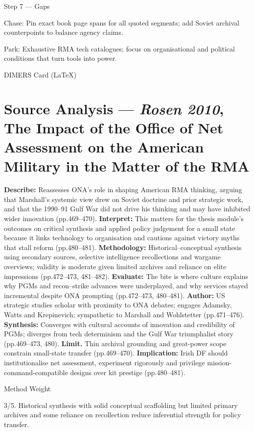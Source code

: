 Step 7 — Gaps

Chase: Pin exact book page spans for all quoted segments; add Soviet archival counterpoints to balance agency claims.

Park: Exhaustive RMA tech catalogues; focus on organisational and political conditions that turn tools into power.

\parencite{ROSEN_2010}

DIMERS Card (LaTeX)

\section*{Source Analysis — \textit{Rosen 2010}, The Impact of the Office of Net Assessment on the American Military in the Matter of the RMA}
\textbf{Describe:} Reassesses ONA’s role in shaping American RMA thinking, arguing that Marshall’s systemic view drew on Soviet doctrine and prior strategic work, and that the 1990–91 Gulf War did not drive his thinking and may have inhibited wider innovation (pp.469–470).
\textbf{Interpret:} This matters for the thesis module’s outcomes on critical synthesis and applied policy judgement for a small state because it links technology to organisation and cautions against victory myths that stall reform (pp.480–481).
\textbf{Methodology:} Historical–conceptual synthesis using secondary sources, selective intelligence recollections and wargame overviews; validity is moderate given limited archives and reliance on elite impressions (pp.472–473, 481–482).
\textbf{Evaluate:} The bite is where culture explains why PGMs and recon–strike advances were underplayed, and why services stayed incremental despite ONA prompting (pp.472–473, 480–481).
\textbf{Author:} US strategic studies scholar with proximity to ONA debates; engages Adamsky, Watts and Krepinevich; sympathetic to Marshall and Wohlstetter (pp.471–476).
\textbf{Synthesis:} Converges with cultural accounts of innovation and credibility of PGMs; diverges from tech determinism and the Gulf War triumphalist story (pp.469–473, 480).
\textbf{Limit.} Thin archival grounding and great-power scope constrain small-state transfer (pp.469–470).
\textbf{Implication:} Irish DF should institutionalise net assessment, experiment rigorously and privilege mission-command-compatible designs over kit prestige (pp.480–481).

Method Weight

3/5. Historical synthesis with solid conceptual scaffolding but limited primary archives and some reliance on recollection reduce inferential strength for policy transfer.

